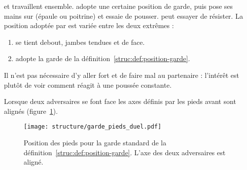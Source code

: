 \begin{exercice}
	\label{struc:ex:test-position}
	


	\A et \D travaillent ensemble.
	\D adopte une certaine position de garde, puis \A pose ses mains sur \D (épaule ou poitrine) et essaie de pousser.
	\D peut essayer de résister.
	La position adoptée par \D est variée entre les deux extrêmes :
	\begin{enumerate}
		\item \D se tient debout, jambes tendues et de face.
		\item \D adopte la garde de la définition~\ref{struc:def:position-garde}.
	\end{enumerate}

	Il n'est pas nécessaire d'y aller fort et de faire mal au partenaire : l'intérêt est plutôt de voir comment \D réagit à une poussée constante.
\end{exercice}


Lorsque deux adversaires se font face les axes définis par les pieds avant sont alignés (figure~\ref{struc:fig:garde-pieds-duel}).

\begin{figure}[ht]
	\centering
	\texttt{[image: structure/garde\_pieds\_duel.pdf]}
	\caption{Position des pieds pour la garde standard de la définition~\ref{struc:def:position-garde}.
	L'axe des deux adversaires est aligné.}
	\label{struc:fig:garde-pieds-duel}
\end{figure}


